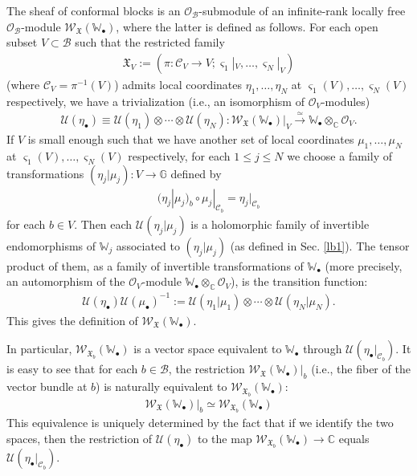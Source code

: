 \documentclass[12pt,a4paper,notitlepage]{article}
\theoremstyle{definition}
\theoremstyle{plain}
\newcommand{\fk}{\mathfrak}
\newcommand{\mc}{\mathcal}
\newcommand{\scr}{\mathscr}
\newcommand{\sgm}{\varsigma}
\newcommand{\blt}{\bullet}
\newcommand{\Wbb}{\mathbb W}
\newcommand{\Gbb}{\mathbb G}
\newcommand{\Cbb}{\mathbb C}
\numberwithin{equation}{section}
\begin{document}
The sheaf of conformal blocks is an $\scr O_{\mc B}$-submodule of an infinite-rank locally free $\scr O_{\mc B}$-module $\scr W_{\fk X}(\Wbb_\blt)$, where the latter is defined as follows. For each open subset $V\subset\mc B$ such that the restricted family \index{XV@$\fk X_V,\mc C_V$}
\begin{align*}
\fk X_V:=(\pi:\mc C_V\rightarrow V;\sgm_1|_V,\dots,\sgm_N|_V)	
\end{align*}
(where $\mc C_V=\pi^{-1}(V)$) admits local coordinates $\eta_1,\dots,\eta_N$ at $\sgm_1(V),\dots,\sgm_N(V)$ respectively,  we have a trivialization (i.e., an isomorphism of $\scr O_V$-modules) \index{U@$\mc U(\eta_\blt)$} \index{WXW@$\scr W_{\fk X}(\Wbb_\blt)$}
\begin{align*}
\mc U(\eta_\blt)\equiv\mc U(\eta_1)\otimes\cdots\otimes\mc U(\eta_N):\scr W_{\fk X}(\Wbb_\blt)|_V\xrightarrow{\simeq} \Wbb_\blt\otimes_\Cbb\scr O_V.	
\end{align*}
If $V$ is small enough such that we have another set of local coordinates $\mu_1,\dots,\mu_N$ at $\sgm_1(V),\dots,\sgm_N(V)$ respectively, for each $1\leq j\leq N$ we choose a family of transformations $(\eta_j|\mu_j):V\rightarrow\Gbb$ defined by 
\begin{align}
\boxed{~(\eta_j|\mu_j)_b\circ\mu_j|_{\mc C_b}=\eta_j|_{\mc C_b}~}	\label{eq8}
\end{align}
for each $b\in V$. Then each $\mc U(\eta_j|\mu_j)$ is a holomorphic family of invertible endomorphisms of $\Wbb_j$ associated to $(\eta_j|\mu_j)$ (as defined in Sec. \ref{lb1}). The tensor product of them, as a family of invertible transformations of $\Wbb_\blt$ (more precisely, an automorphism of the $\scr O_V$-module $\Wbb_\blt\otimes_\Cbb\scr O_V$), is the transition function: 
\begin{align}
\mc U(\eta_\blt)\mc U(\mu_\blt)^{-1}:=\mc U(\eta_1|\mu_1)\otimes\cdots\otimes\mc U(\eta_N|\mu_N).\label{eq11}
\end{align}
This gives the definition of $\scr W_{\fk X}(\Wbb_\blt)$.

In particular, $\scr W_{\fk X_b}(\Wbb_\blt)$ is a vector space equivalent to $\Wbb_\blt$ through $\mc U(\eta_\blt|_{\mc C_b})$. It is easy to see that for each $b\in\mc B$, the restriction $\scr W_{\fk X}(\Wbb_\blt)|_b$ (i.e., the fiber of the vector bundle at $b$) is naturally equivalent to $\scr W_{\fk X_b}(\Wbb_\blt)$:
\begin{align}
\scr W_{\fk X}(\Wbb_\blt)|_b\simeq	 \scr W_{\fk X_b}(\Wbb_\blt)\label{eq6}
\end{align}
This equivalence is uniquely determined by the fact that if we identify the two spaces, then  the restriction of $\mc U(\eta_\blt)$ to the map $\scr W_{\fk X_b}(\Wbb_\blt)\rightarrow\Cbb$ equals $\mc U(\eta_\blt|_{\mc C_b})$. 
\end{document}
